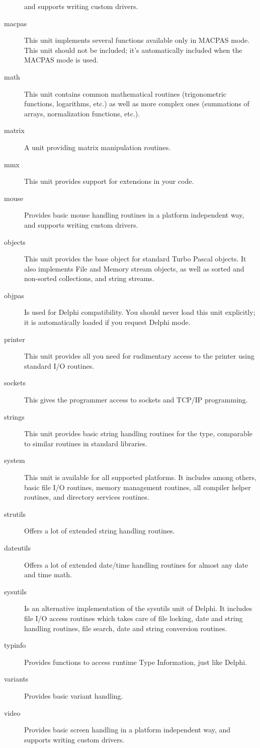\begin{description}
and supports writing custom drivers.
\item[macpas] This unit implements several functions available only in MACPAS mode.
This unit should not be included; it's automatically included when the MACPAS mode is used.
\item[math] This unit contains common mathematical routines (trigonometric
functions, logarithms, etc.) as well as more complex ones (summations of arrays,
normalization functions, etc.).
\item[matrix] A unit providing matrix manipulation routines.
\item[mmx] This unit provides support for  extensions in your
code.
\item[mouse] Provides basic mouse handling routines in a platform independent way,
and supports writing custom drivers.
\item [objects]  This unit provides the base object for standard Turbo Pascal
objects. It also implements File and Memory stream objects, as well as sorted
and non-sorted collections, and string streams.
\item[objpas] Is used for Delphi compatibility. You should never load this
unit explicitly; it is automatically loaded if you request Delphi mode.
\item[printer]  This unit provides all you need for rudimentary access
to the printer using standard I/O routines.
\item[sockets] This gives the programmer access to sockets and TCP/IP
programming.
\item[strings] This unit provides basic string handling routines for the
 type, comparable to similar routines in standard 
libraries.
\item[system] This unit is available for all supported platforms. It includes
among others, basic file I/O routines, memory management routines, all compiler
helper routines, and directory services routines.
\item[strutils] Offers a lot of extended string handling routines.
\item[dateutils] Offers a lot of extended date/time handling routines for
almost any date and time math.
\item[sysutils] Is an alternative implementation of the sysutils unit of
Delphi. It includes file I/O access routines which takes care of file
locking, date and string handling routines, file search, date and string
conversion routines.
\item[typinfo] Provides functions to access runtime Type Information, just
like Delphi.
\item[variants] Provides basic variant handling.
\item[video] Provides basic screen handling in a platform independent way,
and supports writing custom drivers.
\end{description}

